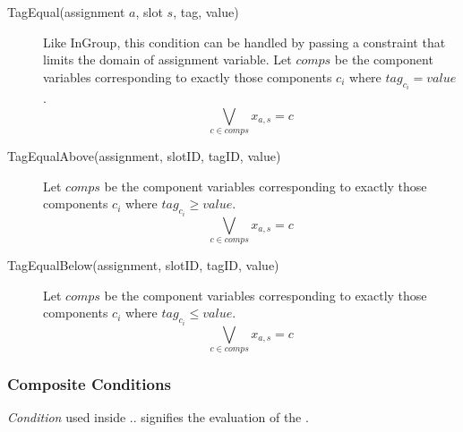 \begin{description}
\item[TagEqual(assignment $a$, slot $s$, tag, value)]
Like InGroup, this condition can be handled by passing a constraint that limits the domain of assignment variable.
Let $comps$ be the component variables corresponding to exactly those components $c_i$ where $tag_{c_i} = value$.
$$ \bigvee_{c\in comps} x_{a,s} = c$$

\item[TagEqualAbove(assignment, slotID, tagID, value)]	
Let $comps$ be the component variables corresponding to exactly those components $c_i$ where $tag_{c_i} \geq value$.
$$ \bigvee_{c\in comps} x_{a,s} = c$$


\item[TagEqualBelow(assignment, slotID, tagID, value)]	
Let $comps$ be the component variables corresponding to exactly those components $c_i$ where $tag_{c_i} \leq value$.
$$ \bigvee_{c\in comps} x_{a,s} = c$$



\end{description}


\subsubsection{Composite Conditions}

\textit{Condition} used inside .. signifies the evaluation of the .

